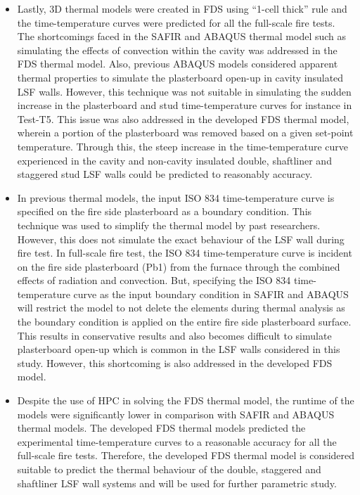 \begin{itemize}
	\item Lastly, 3D thermal models were created in FDS using ``1-cell thick'' rule and the time-temperature curves were predicted for all the full-scale fire tests. The shortcomings faced in the SAFIR and ABAQUS thermal model such as simulating the effects of convection within the cavity was addressed in the FDS thermal model. Also, previous ABAQUS models considered apparent thermal properties to simulate the plasterboard open-up in cavity insulated LSF walls. However, this technique was not suitable in simulating the sudden increase in the plasterboard and stud time-temperature curves for instance in Test-T5. This issue was also addressed in the developed FDS thermal model, wherein a portion of the plasterboard was removed based on a given set-point temperature. Through this, the steep increase in the time-temperature curve experienced in the cavity and non-cavity insulated double, shaftliner and staggered stud LSF walls could be predicted to reasonably accuracy.
	\item In previous thermal models, the input ISO 834 time-temperature curve is specified on the fire side plasterboard as a boundary condition. This technique was used to simplify the thermal model by past researchers. However, this does not simulate the exact behaviour of the LSF wall during fire test. In full-scale fire test, the ISO 834 time-temperature curve is incident on the fire side plasterboard (Pb1) from the furnace through the combined effects of radiation and convection. But, specifying the ISO 834 time-temperature curve as the input boundary condition in SAFIR and ABAQUS will restrict the model to not delete the elements during thermal analysis as the boundary condition is applied on the entire fire side plasterboard surface. This results in conservative results and also becomes difficult to simulate plasterboard open-up which is common in the LSF walls considered in this study. However, this shortcoming is also addressed in the developed FDS model.
	\item Despite the use of HPC in solving the FDS thermal model, the runtime of the models were significantly lower in comparison with SAFIR and ABAQUS thermal models. The developed FDS thermal models predicted the experimental time-temperature curves to a reasonable accuracy for all the full-scale fire tests. Therefore, the developed FDS thermal model is considered suitable to predict the thermal behaviour of the double, staggered and shaftliner LSF wall systems and will be used for further parametric study.
\end{itemize}

